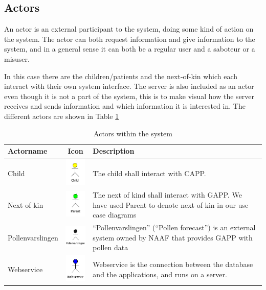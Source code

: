 \subsection{Actors}
An actor is an external participant to the system, doing some kind of action on the system. 
The actor can both request information and give information to the system, and in a general 
sense it can both be a regular user and a saboteur or a misuser.

In this case there are the children/patients and the next-of-kin which each interact with their 
own system interface. The server is also included as an actor even though it is not a part of 
the system, this is to make visual how the server receives and sends information and which 
information it is interested in. The different actors are shown in Table \ref{tab:actortable}

\begin{table}
	\centering
	\begin{tabular}{| l | c | p{5.0cm} |}
	\hline
	Actorname & Icon & Description \\
	\hline
	Child & \includegraphics[width=1cm]{Pictures/ArchPictures/actors/child.png} & The child shall interact  with CAPP.  \\
	\hline
	Next of kin & \includegraphics[width=1cm]{Pictures/ArchPictures/actors/parent.png} &  The next of kind shall interact with GAPP. We have used Parent to denote next of kin in our use case diagrams\\
	\hline
	Pollenvarslingen & \includegraphics[width=1.5cm]{Pictures/ArchPictures/actors/pollencast.png} & ``Pollenvarslingen'' (``Pollen forecast'') is an external system owned by NAAF that provides GAPP with pollen data \\
	\hline
	Webservice & \includegraphics[width=1cm]{Pictures/ArchPictures/actors/webservice.png} & Webservice is the connection between the database and the applications, and runs on a server. \\
	\hline
	\end{tabular}
	\label{tab:actortable}
	\caption{Actors within the system}
\end{table}

